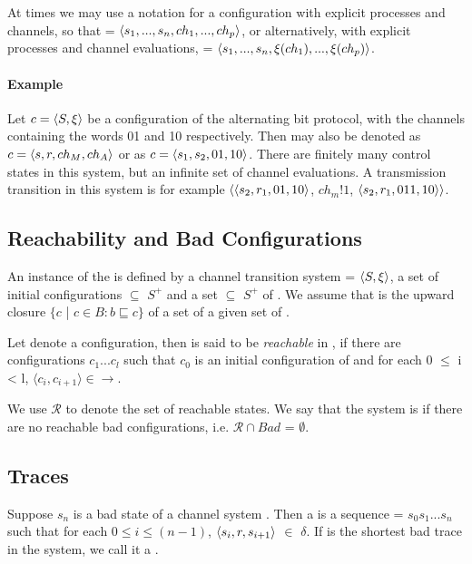 At times we may use a notation for a configuration  with explicit processes and channels, so that  = $\langle s_1,...,s_n, ch_1,...,ch_p\rangle$, or alternatively, with explicit processes and channel evaluations,  = $\langle s_1,...,s_n, \xi(ch_1),...,\xi(ch_p)\rangle$.

\paragraph{Example}
Let $c = \langle S,\xi\rangle$ be a configuration of the alternating bit protocol, with the channels containing the words 01 and 10 respectively. Then  may also be denoted as $c = \langle s,r,ch_M,ch_A\rangle$ or as $c = \langle s_1,s_2,01,10\rangle$. There are finitely many control states in this system, but an infinite set of channel evaluations. A transmission transition in this system is for example $\langle\langle s_2,r_1,01,10\rangle$, $ch_m!1$, $\langle s_2,r_1,011,10\rangle\rangle$. 

\subsection{Reachability and Bad Configurations}
\label{bad}
An instance of the  is defined by a channel transition system  = $\langle S,\xi\rangle$, a set of initial configurations  $\subseteq$ $S^+$ and a set  $\subseteq$ $S^+$ of . We assume that  is the upward closure $\{c$ | $ c \in B: b \sqsubseteq c\}$ of a set of a given  set of . 

Let  denote a configuration, then  is said to be \emph{reachable} in , if there are configurations $c_1...c_l$ such that $c_0$ is an initial configuration of  and for each 0 $\leq$ i < l, $\langle c_i, c_{i+1} \rangle \in \rightarrow$.

We use $\mathcal{R}$ to denote the set of reachable states. We say that the system  is  if there are no reachable bad configurations, i.e. $\mathcal{R} \cap Bad$ = $\emptyset$.

\subsection{Traces}
\label{traces}

Suppose $s_n$ is a bad state of a channel system . Then a  is a sequence  = $s_0s_1...s_n$ such that for each $0 \leq i \leq (n-1)$, $\langle s_i,r,s_{i+1}\rangle$ $\in$ $\delta$. If  is the shortest bad trace in the system, we call it a .

